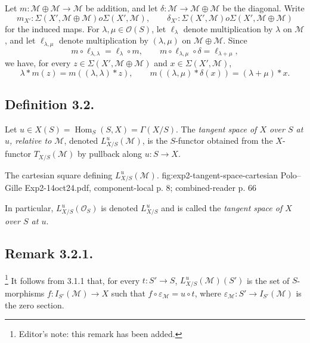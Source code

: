 Let \(m:\mathcal M\oplus\mathcal M\to\mathcal M\) be addition, and let
\(\delta:\mathcal M\to\mathcal M\oplus\mathcal M\) be the diagonal.
Write
\[
  m_{X'}:\Sigma(X',\mathcal M\oplus\mathcal M)	o
    \Sigma(X',\mathcal M),
  \qquad
  \delta_{X'}:\Sigma(X',\mathcal M)	o
    \Sigma(X',\mathcal M\oplus\mathcal M)
\]
for the induced maps. For \(\lambda,\mu\in\mathcal O(S)\), let
\(\ell_\lambda\) denote multiplication by \(\lambda\) on \(\mathcal M\),
and let \(\ell_{\lambda,\mu}\) denote multiplication by
\((\lambda,\mu)\) on \(\mathcal M\oplus\mathcal M\). Since
\[
  m\circ\ell_{\lambda,\lambda}=\ell_\lambda\circ m,
  \qquad
  m\circ\ell_{\lambda,\mu}\circ\delta=\ell_{\lambda+\mu},
\]
we have, for every \(z\in\Sigma(X',\mathcal M\oplus\mathcal M)\) and
\(x\in\Sigma(X',\mathcal M)\),
\begin{equation}
  \lambda*m(z)=m((\lambda,\lambda)*z),
  \qquad
  m((\lambda,\mu)*\delta(x))=(\lambda+\mu)*x.
  \tag{$\dagger$}
\end{equation}

\subsection*{Definition 3.2.}
Let \(u\in X(S)=\operatorname{Hom}_S(S,X)=\Gamma(X/S)\). The
\emph{tangent space of \(X\) over \(S\) at \(u\), relative to
\(\mathcal M\)}, denoted \(L^u_{X/S}(\mathcal M)\), is the \(S\)-functor
obtained from the \(X\)-functor \(T_{X/S}(\mathcal M)\) by pullback along
\(u:S\to X\).

  {The cartesian square defining \(L^u_{X/S}(\mathcal M)\).}
  {fig:exp2-tangent-space-cartesian}
  {Polo--Gille Exp2-14oct24.pdf, component-local p. 8; combined-reader p. 66}

In particular, \(L^u_{X/S}(\mathcal O_S)\) is denoted \(L^u_{X/S}\) and
is called the \emph{tangent space of \(X\) over \(S\) at \(u\)}.

\subsection*{Remark 3.2.1.}
\footnote{Editor's note: this remark has been added.}
It follows from 3.1.1 that, for every \(t:S'\to S\),
\(L^u_{X/S}(\mathcal M)(S')\) is the set of \(S\)-morphisms
\(f:I_{S'}(\mathcal M)\to X\) such that
\(f\circ\varepsilon_{\mathcal M}=u\circ t\), where
\(\varepsilon_{\mathcal M}:S'\to I_{S'}(\mathcal M)\) is the zero
section.

